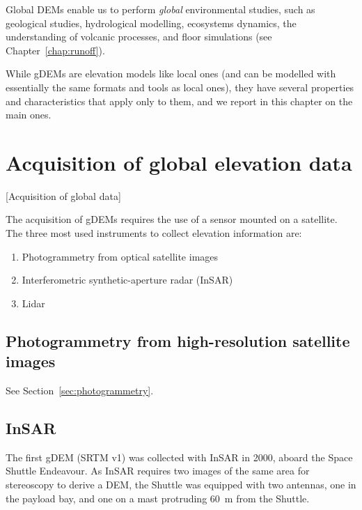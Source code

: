 %

Global DEMs enable us to perform \emph{global} environmental studies, such as geological studies, hydrological modelling, ecosystems dynamics, the understanding of volcanic processes, and floor simulations (see Chapter~\ref{chap:runoff}).

%

While gDEMs are elevation models like local ones (and can be modelled with essentially the same formats and tools as local ones), they have several properties and characteristics that apply only to them, and we report in this chapter on the main ones.



%
\section{Acquisition of global elevation data}[Acquisition of global data]

The acquisition of gDEMs requires the use of a sensor mounted on a satellite.
The three most used instruments to collect elevation information are:
\begin{enumerate}
  \item Photogrammetry from optical satellite images
  \item Interferometric synthetic-aperture radar (InSAR)
  \item Lidar
\end{enumerate}


\subsection{Photogrammetry from high-resolution satellite images}

See Section~\ref{sec:photogrammetry}.


\subsection{InSAR}%

The first gDEM (SRTM v1) was collected with InSAR in 2000, aboard the Space Shuttle Endeavour.
As InSAR requires two images of the same area for stereoscopy to derive a DEM, the Shuttle was equipped with two antennas, one in the payload bay, and one on a mast protruding \qty{60}{m} from the Shuttle.

